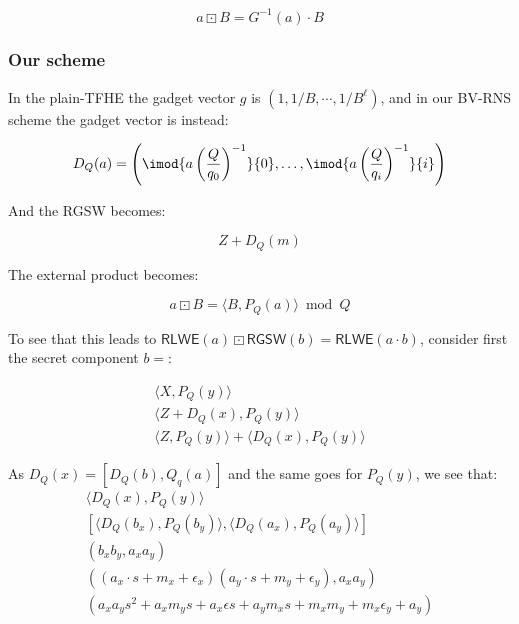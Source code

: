 \begin{equation*}
    a\boxdot B = G^{-1}(a) \cdot B
\end{equation*}



\newpage
\subsubsection{Our scheme}
In the plain-TFHE the gadget vector $g$ is $(1, 1/B, \cdots, 1/B^{\ell})$, and in our BV-RNS scheme the gadget vector is instead:

\begin{equation*}
    D_{Q}({a}) = \left(\imod{a\left(\frac{Q}{q_0}\right)^{-1}}{0},\dots,\imod{a\left(\frac{Q}{q_i}\right)^{-1}}{i}\right)
\end{equation*}

\noindent And the RGSW becomes:

\begin{equation}
    Z + D_Q(m)
\end{equation}

\noindent The external product becomes:

\begin{equation}
    a\boxdot B = \langle B, P_Q(a)\rangle \bmod{Q}
\end{equation}

\noindent To see that this leads to $\mathsf{RLWE}(a) \boxdot \mathsf{RGSW}(b) = \mathsf{RLWE}(a\cdot b)$, consider first the secret component $b = $:

\begin{gather*}
    \langle X, P_Q(y)\rangle \\ %
    \langle Z + D_Q(x), P_Q(y)\rangle \\ %
    \langle Z, P_Q(y)\rangle + \langle D_Q(x), P_Q(y)\rangle %
\end{gather*}

As $D_Q(x) = [D_Q(b), Q_q(a)]$ and the same goes for $P_Q(y)$, we see that: 
\begin{gather}
    \langle D_Q(x), P_Q(y)\rangle \\
    [\langle D_Q(b_x), P_Q(b_y) \rangle, \langle D_Q(a_x), P_Q(a_y) \rangle] \\ 
    (b_xb_y, a_xa_y) \\
    ((a_x\cdot s + m_x + \epsilon_x)(a_y\cdot s + m_y + \epsilon_y), a_xa_y) \\
    (a_xa_y s^2 + a_xm_ys + a_x \epsilon s + a_ym_xs + m_xm_y + m_x\epsilon_y + a_y)
\end{gather}


